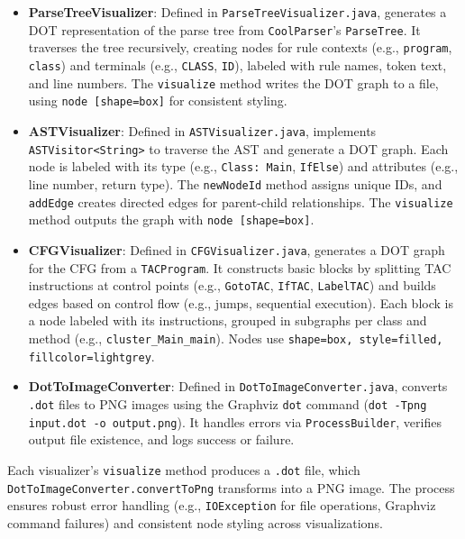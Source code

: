 \documentclass[11pt, titlepage]{article}
\begin{document}
\begin{itemize}[leftmargin=*]
    \item \textbf{ParseTreeVisualizer}: Defined in \texttt{ParseTreeVisualizer.java}, generates a DOT representation of the parse tree from \texttt{CoolParser}'s \texttt{ParseTree}. It traverses the tree recursively, creating nodes for rule contexts (e.g., \texttt{program}, \texttt{class}) and terminals (e.g., \texttt{CLASS}, \texttt{ID}), labeled with rule names, token text, and line numbers. The \texttt{visualize} method writes the DOT graph to a file, using \texttt{node [shape=box]} for consistent styling.
    \item \textbf{ASTVisualizer}: Defined in \texttt{ASTVisualizer.java}, implements \texttt{ASTVisitor<String>} to traverse the AST and generate a DOT graph. Each node is labeled with its type (e.g., \texttt{Class: Main}, \texttt{IfElse}) and attributes (e.g., line number, return type). The \texttt{newNodeId} method assigns unique IDs, and \texttt{addEdge} creates directed edges for parent-child relationships. The \texttt{visualize} method outputs the graph with \texttt{node [shape=box]}.
    \item \textbf{CFGVisualizer}: Defined in \texttt{CFGVisualizer.java}, generates a DOT graph for the CFG from a \texttt{TACProgram}. It constructs basic blocks by splitting TAC instructions at control points (e.g., \texttt{GotoTAC}, \texttt{IfTAC}, \texttt{LabelTAC}) and builds edges based on control flow (e.g., jumps, sequential execution). Each block is a node labeled with its instructions, grouped in subgraphs per class and method (e.g., \texttt{cluster\_Main\_main}). Nodes use \texttt{shape=box, style=filled, fillcolor=lightgrey}.
    \item \textbf{DotToImageConverter}: Defined in \texttt{DotToImageConverter.java}, converts \texttt{.dot} files to PNG images using the Graphviz \texttt{dot} command (\texttt{dot -Tpng input.dot -o output.png}). It handles errors via \texttt{ProcessBuilder}, verifies output file existence, and logs success or failure.
\end{itemize}

Each visualizer's \texttt{visualize} method produces a \texttt{.dot} file, which \texttt{DotToImageConverter.convertToPng} transforms into a PNG image. The process ensures robust error handling (e.g., \texttt{IOException} for file operations, Graphviz command failures) and consistent node styling across visualizations.
\end{document}
